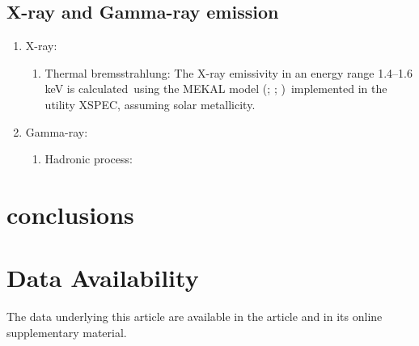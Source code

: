 \documentclass[twocolumn]{aastex631}
\begin{document}
\subsection{X-ray and Gamma-ray emission}
  \begin{enumerate}
    \item X-ray:
       \begin{enumerate}
         \item Thermal bremsstrahlung: The X-ray emissivity in an energy range 1.4–1.6 keV is calculated\
               using the MEKAL model (\citealt{Xray-1}; \citealt{Xray-2}; \citealt{Xray-3})\
               implemented in the utility XSPEC\citep{XSPEC}, assuming solar metallicity.
       \end{enumerate}
    \item Gamma-ray:
       \begin{enumerate}
         \item Hadronic process:
       \end{enumerate}
  \end{enumerate}


\section{conclusions}

\section*{Data Availability}
The data underlying this article are available in the article and in its online supplementary material.





\appendix
\end{document}
